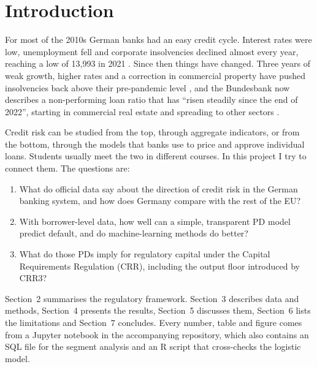 \documentclass[11pt,a4paper]{article}
\begin{document}
\section{Introduction}
For most of the 2010s German banks had an easy credit cycle. Interest rates were low, unemployment fell and corporate insolvencies declined almost every year, reaching a low of 13,993 in 2021 \citep{destatis2023}. Since then things have changed. Three years of weak growth, higher rates and a correction in commercial property have pushed insolvencies back above their pre-pandemic level \citep{destatis2026}, and the Bundesbank now describes a non-performing loan ratio that has ``risen steadily since the end of 2022'', starting in commercial real estate and spreading to other sectors \citep{bbk2025}.

Credit risk can be studied from the top, through aggregate indicators, or from the bottom, through the models that banks use to price and approve individual loans. Students usually meet the two in different courses. In this project I try to connect them. The questions are:

\begin{enumerate}[leftmargin=1.5em,itemsep=2pt]
\item What do official data say about the direction of credit risk in the German banking system, and how does Germany compare with the rest of the EU?
\item With borrower-level data, how well can a simple, transparent PD model predict default, and do machine-learning methods do better?
\item What do those PDs imply for regulatory capital under the Capital Requirements Regulation (CRR), including the output floor introduced by CRR3?
\end{enumerate}

Section~2 summarises the regulatory framework. Section~3 describes data and methods, Section~4 presents the results, Section~5 discusses them, Section~6 lists the limitations and Section~7 concludes. Every number, table and figure comes from a Jupyter notebook in the accompanying repository, which also contains an SQL file for the segment analysis and an R script that cross-checks the logistic model.
\end{document}
